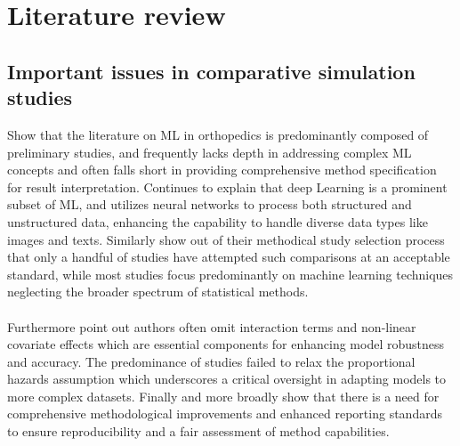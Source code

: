 \section{Literature review}
\subsection{Important issues in comparative simulation studies}

\noindent \parencite{polce_guide_2023} Show that the literature on ML in orthopedics is predominantly composed of preliminary studies, and frequently lacks depth in addressing complex ML concepts and often falls short in providing comprehensive method specification for result interpretation. \parencite{polce_guide_2023} Continues to explain that deep Learning is a prominent subset of ML, and utilizes neural networks to process both structured and unstructured data, enhancing the capability to handle diverse data types like images and texts. Similarly \parencite{smith_scoping_2022} show out of their methodical study selection process that only a handful of studies have attempted such comparisons at an acceptable standard, while most studies focus predominantly on machine learning techniques neglecting the broader spectrum of statistical methods. 
\\\\
Furthermore \parencite{smith_scoping_2022} point out authors often omit interaction terms and non-linear covariate effects which are essential components for enhancing model robustness and accuracy. The predominance of studies failed to relax the proportional hazards assumption which underscores a critical oversight in adapting models to more complex datasets. Finally and more broadly \parencite{smith_scoping_2022} show that there is a need for comprehensive methodological improvements and enhanced reporting standards to ensure reproducibility and a fair assessment of method capabilities.
\\\\
